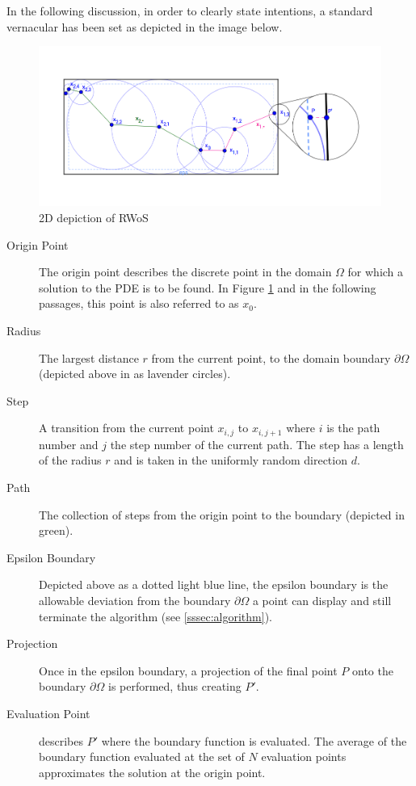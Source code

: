 In the following discussion, in order to clearly state intentions, a standard
vernacular has been set as depicted in the image below.

\begin{figure}
\includegraphics[width=15.0cm]{styles/WoS}
  \caption{2D depiction of \Gls{RWoS}}
  \label{fig:overview}
\end{figure}

\begin{description}
\item[Origin Point] The origin point describes the discrete point in the domain
$\Omega$ for which a solution to the PDE is to be found. In Figure \ref{fig:overview}
and in the following passages, this point is also referred to as $x_{0}$.
\item[Radius] The largest distance $r$ from the current point, to the domain boundary
$\partial\Omega$ (depicted above in as lavender circles).
\item[Step] A transition from the current point $x_{i,j}$ to $x_{i,j+1}$ where
$i$ is the path number and $j$ the step number of the current path.  The step has
a length of the radius $r$ and is taken in the uniformly random direction $d$.
\item[Path] The collection of steps from the origin point to the boundary (depicted in green).
\item[Epsilon Boundary] Depicted above as a dotted light blue line, the epsilon boundary
is the allowable deviation from the boundary $\partial\Omega$ a point can display
and still terminate the algorithm (see \ref{sssec:algorithm}).
\item[Projection] Once in the epsilon boundary, a projection of the final point $P$
onto the boundary $\partial\Omega$ is performed, thus creating $P'$.
\item[Evaluation Point] describes $P'$ where the boundary function is evaluated.
The average of the boundary function evaluated at the set of $N$ evaluation points
approximates the solution at the origin point.
\end{description}


